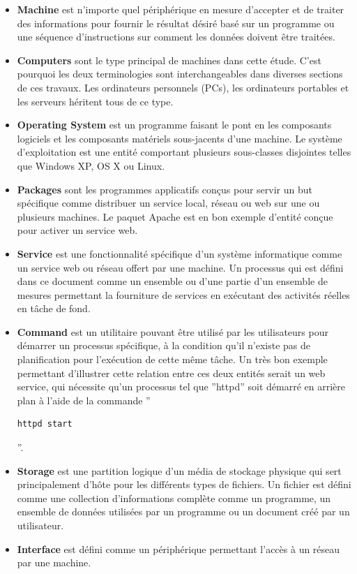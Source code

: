 \begin{itemize}
  \item \textbf{Machine} est n'importe quel périphérique en mesure d'accepter et
	  de traiter des informations pour fournir le résultat désiré basé sur
	  un programme ou une séquence d'instructions sur comment les données
	  doivent être traitées.
  \item \textbf{Computers} sont le type principal de machines dans cette étude.
	  C'est pourquoi les deux terminologies sont interchangeables dans
	  diverses sections de ces travaux. Les ordinateurs personnels (PCs),
	  les ordinateurs portables et les serveurs héritent tous de ce type.
  \item \textbf{Operating System} est un programme faisant le pont en les
	  composants logiciels et les composants matériels sous-jacents d'une
	  machine. Le système d'exploitation est une entité comportant plusieurs
	  sous-classes disjointes telles que Windows XP, OS X ou Linux.
  \item \textbf{Packages} sont les programmes applicatifs conçus pour servir un
	  but spécifique comme distribuer un service local, réseau ou web sur
	  une ou plusieurs machines. Le paquet Apache est en bon exemple
	  d'entité conçue pour activer un service web.
  \item \textbf{Service} est une fonctionnalité spécifique d'un système
	  informatique comme un service web ou réseau offert par une machine. Un
	  processus qui est défini dans ce document comme un ensemble ou d'une
	  partie d'un ensemble de mesures permettant la fourniture de services
	  en exécutant des activités réelles en tâche de fond.
  \item \textbf{Command} est un utilitaire pouvant être utilisé par les
	  utilisateurs pour démarrer un processus spécifique, à la condition
	  qu'il n'existe pas de planification pour l'exécution de cette même
	  tâche. Un très bon exemple permettant d'illustrer cette relation
	  entre ces deux entités serait un web service, qui nécessite qu'un
	  processus tel que ''httpd'' soit démarré en arrière plan à l'aide de
	  la commande ''\begin{verbatim}httpd start\end{verbatim}''.
  \item \textbf{Storage} est une partition logique d'un média de stockage
	  physique qui sert principalement d'hôte pour les différents types de
	  fichiers. Un fichier est défini comme une collection d'informations
	  complète comme un programme, un ensemble de données utilisées par un
	  programme ou un document créé par un utilisateur.
  \item \textbf{Interface} est défini comme un périphérique permettant l'accès à
	  un réseau par une machine.
\end{itemize}


